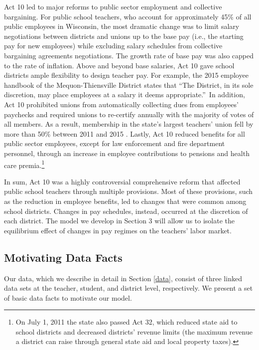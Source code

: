 \documentclass[notitlepage,12pt]{article}%
\begin{document}
Act 10 led to major reforms to public sector employment and collective
bargaining. For public school teachers, who account for approximately 45\% of
all public employees in Wisconsin, the most dramatic change was to limit
salary negotiations between districts and unions up to the base pay (i.e., the
starting pay for new employees) while excluding salary schedules from
collective bargaining agreements negotiations. The growth rate of base pay was
also capped to the rate of inflation. Above and beyond base salaries, Act 10
gave school districts ample flexibility to design teacher pay. For example,
the 2015 employee handbook of the Mequon-Thiensville District states that
\textquotedblleft The District, in its sole discretion, may place employees at
a salary it deems appropriate.\textquotedblright\ In addition, Act 10
prohibited unions from automatically collecting dues from employees' paychecks
and required unions to re-certify annually with the majority of votes of all
members. As a result, membership in the state’s largest teachers’ union fell by more than 50\% between 2011 and 2015 \citep{baron2018effect}. Lastly, Act 10 reduced benefits for all public sector employees, except
for law enforcement and fire department personnel, through an increase in
employee contributions to pensions and health care premia.\footnote{On July 1,
2011 the state also passed Act 32, which reduced state aid to school districts
and decreased districts' revenue limits (the maximum revenue a district can
raise through general state aid and local property taxes).}

In sum, Act 10 was a highly controversial comprehensive reform that affected
public school teachers through multiple provisions. Most of these provisions,
such as the reduction in employee benefits, led to changes that were common
among school districts. Changes in pay schedules, instead, occurred at the
discretion of each district. The model we develop in Section 3 will allow us
to isolate the equilibrium effect of changes in pay regimes on the teachers'
labor market.

\subsection{Motivating Data Facts}

Our data, which we describe in detail in Section \ref{data}, consist of three
linked data sets at the teacher, student, and district level, respectively. We
present a set of basic data facts to motivate our model.
\end{document}
